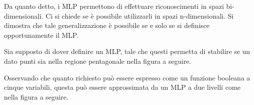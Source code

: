 \documentclass{subfiles}
\begin{document}
Da quanto detto, i MLP permettono di effettuare riconoscimenti in spazi bi-dimensionali.
Ci si chiede se è possibile utilizzarli in spazi n-dimensionali.
Si dimostra che tale generalizzazione è possibile se e solo se si definisce opportunamente il MLP.
\begin{Example*}
    Sia supposto di dover definire un MLP, tale che questi permetta di stabilire se un dato punti sia nella regione pentagonale nella figura a seguire.
    
    Osservando che quanto richiesto può essere espresso come un funzione booleana a cinque variabili,
    questa può essere approssimata da un MLP a due livelli come nella figura a seguire.
    
\end{Example*}
\end{document}
